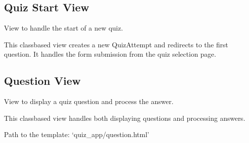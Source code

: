 \documentclass[letterpaper,10pt,english]{sphinxmanual}
\begin{document}
\subsection{Quiz Start View}
\label{\detokenize{views:quiz-start-view}}

\begin{fulllineitems}
\label{\detokenize{views:QuizStartView}}
\pysigstartsignatures
\pysigline
{}
\pysigstopsignatures
\sphinxAtStartPar
View to handle the start of a new quiz.

\sphinxAtStartPar
This class\sphinxhyphen{}based view creates a new QuizAttempt and redirects to the first question.
It handles the form submission from the quiz selection page.

\end{fulllineitems}



\subsection{Question View}
\label{\detokenize{views:question-view}}

\begin{fulllineitems}
\label{\detokenize{views:QuestionView}}
\pysigstartsignatures
\pysigline
{}
\pysigstopsignatures
\sphinxAtStartPar
View to display a quiz question and process the answer.

\sphinxAtStartPar
This class\sphinxhyphen{}based view handles both displaying questions and processing answers.

\begin{fulllineitems}
\label{\detokenize{views:QuestionView.template_name}}
\pysigstartsignatures
\pysigline
{}
\pysigstopsignatures
\sphinxAtStartPar
Path to the template: ‘quiz\_app/question.html’

\end{fulllineitems}


\end{fulllineitems}
\end{document}
